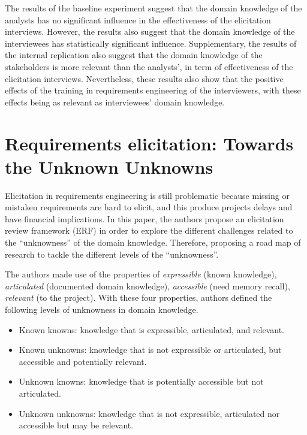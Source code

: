 \documentclass[]{llncs}
\begin{document}
The results of the baseline experiment suggest that the domain knowledge
of the analysts has no significant influence in the effectiveness of the
elicitation interviews. However, the results also suggest that the
domain knowledge of the interviewees has statistically significant
influence. Supplementary, the results of the internal replication also
suggest that the domain knowledge of the stakeholders is more relevant
than the analysts', in term of effectiveness of the elicitation
interviews. Nevertheless, these results also show that the positive
effects of the training in requirements engineering of the interviewers,
with these effects being as relevant as interviewees' domain knowledge.

\hypertarget{requirements-elicitation-towards-the-unknown-unknowns}{%
\section{Requirements elicitation: Towards the Unknown
Unknowns}\label{requirements-elicitation-towards-the-unknown-unknowns}}

Elicitation in requirements engineering is still problematic because
missing or mistaken requirements are hard to elicit, and this produce
projects delays and have financial implications. In this paper, the
authors propose an elicitation review framework (ERF) in order to
explore the different challenges related to the ``unknowness'' of the
domain knowledge. Therefore, proposing a road map of research to tackle
the different levels of the ``unknowness''.

The authors made use of the properties of \emph{expressible} (known
knowledge), \emph{articulated} (documented domain knowledge),
\emph{accessible} (need memory recall), \emph{relevant} (to the
project). With these four properties, authors defined the following
levels of unknowness in domain knowledge.

\begin{itemize}
\tightlist
\item
  Known knowns: knowledge that is expressible, articulated, and
  relevant.
\item
  Known unknowns: knowledge that is not expressible or articulated, but
  accessible and potentially relevant.
\item
  Unknown knowns: knowledge that is potentially accessible but not
  articulated.
\item
  Unknown unknowns: knowledge that is not expressible, articulated nor
  accessible but may be relevant.
\end{itemize}
\end{document}
